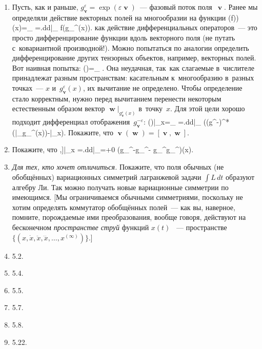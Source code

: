 \documentclass[a4paper,11pt]{article}
\def\[#1\]{\begin{align*}#1\end{align*}}
\theoremstyle{definition}
\begin{document}
\begin{enumerate}
\item
Пусть, как и раньше, $g_\mbfv^\varepsilon=\exp(\varepsilon\mbfv)$~— фазовый поток
поля~$\mbfv$. Ранее мы определяли действие векторных полей на многообразии на
функции
	\[
	(\mbfv(f))(x)=\lim_{\varepsilon{}}\varepsilon
		=\left.\frac d{d\varepsilon}\right|_{}
		f(g_\mbfv^\varepsilon(x)).
	\]
как действие дифференциальных операторов~— это просто дифференцирование функции
вдоль векторного поля (не путать с~ковариантной производной!).
Можно попытаться по аналогии определить дифференцирование других тензорных
объектов, например, векторных полей. Вот наивная попытка:
	\[
	\mbfv(\mbfw)=\lim_{\varepsilon{}}
		\varepsilon.
	\]
Она неудачная, так~как слагаемые в~числителе принадлежат разным
пространствам: касательным к~многообразию в~разных точках~— $x$
и~$g_\mbfv^\varepsilon(x)$, их вычитание не определено. Чтобы определение стало
корректным, нужно перед вычитанием перенести некоторым естественным образом
вектор $\mbfw|_{g_\mbfv^\varepsilon(x)}$ в~точку~$x$. Для этой цели хорошо
подходит дифференциал отображения~$g_\mbfv^{-\varepsilon}$:
	\[
	\mbfv(\mbfw)|_x=\lim_{\varepsilon{}}
		\varepsilon
		=\left.\frac d{d\varepsilon}\right|_{}
		\left((g^{-\varepsilon})^*(\mbfw|_{g_\mbfv^\varepsilon(x)})-\mbfw|_x\right).
	\]
Покажите, что $\mbfv(\mbfw)=[\mbfv,\mbfw]$.

\item
Покажите, что
	\[
	[\mbfv,\mbfw]|_x
		=\left.\frac d{d\varepsilon}\right|_{\varepsilon=+0}
		\left(g_\mbfw^{-\sqrt\varepsilon}\circ g_\mbfv^{-\sqrt\varepsilon}
		\circ g_\mbfw^{\sqrt\varepsilon}\circ g_\mbfv^{\sqrt\varepsilon}\right)(x).
	\]

\item
\emph{Для тех, кто хочет отличиться.} Покажите, что поля обычных (не
обобщённых) вариационных симметрий лагранжевой задачи $\int L\,dt$ образуют
алгебру Ли. Так можно получать новые вариационные симметрии по имеющимся. [Мы
ограничиваемся обычными симметриями, поскольку не хотим определять коммутатор
обобщённых полей~— как вы, наверное, помните, порождаемые ими преобразования,
вообще говоря, действуют на бесконечном \emph{пространстве струй\/} функций
$x(t)$ ~— пространстве $\{(x,\dot x,\ddot x,\dddot x,\ldots,x^{(\infty)})\}$.]

\item
5.2.

\item
5.4.

\item
5.5.

\item
5.7.

\item
5.8.

\item
5.22.

\end{enumerate}
\end{document}
